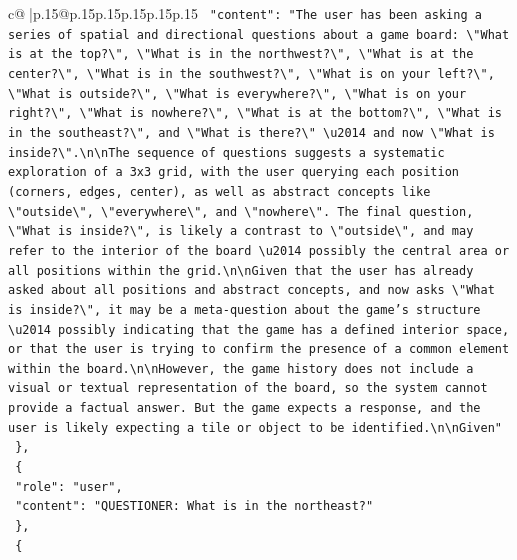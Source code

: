 \documentclass{article}
\begin{document}
{\begin{supertabular}{c@{$\;$}|p{.15\linewidth}@{}p{.15\linewidth}p{.15\linewidth}p{.15\linewidth}p{.15\linewidth}p{.15\linewidth}}
{{{\texttt{    "content": "The user has been asking a series of spatial and directional questions about a game board: \textbackslash{}"What is at the top?\textbackslash{}", \textbackslash{}"What is in the northwest?\textbackslash{}", \textbackslash{}"What is at the center?\textbackslash{}", \textbackslash{}"What is in the southwest?\textbackslash{}", \textbackslash{}"What is on your left?\textbackslash{}", \textbackslash{}"What is outside?\textbackslash{}", \textbackslash{}"What is everywhere?\textbackslash{}", \textbackslash{}"What is on your right?\textbackslash{}", \textbackslash{}"What is nowhere?\textbackslash{}", \textbackslash{}"What is at the bottom?\textbackslash{}", \textbackslash{}"What is in the southeast?\textbackslash{}", and \textbackslash{}"What is there?\textbackslash{}" \textbackslash{}u2014 and now \textbackslash{}"What is inside?\textbackslash{}".\textbackslash{}n\textbackslash{}nThe sequence of questions suggests a systematic exploration of a 3x3 grid, with the user querying each position (corners, edges, center), as well as abstract concepts like \textbackslash{}"outside\textbackslash{}", \textbackslash{}"everywhere\textbackslash{}", and \textbackslash{}"nowhere\textbackslash{}". The final question, \textbackslash{}"What is inside?\textbackslash{}", is likely a contrast to \textbackslash{}"outside\textbackslash{}", and may refer to the interior of the board \textbackslash{}u2014 possibly the central area or all positions within the grid.\textbackslash{}n\textbackslash{}nGiven that the user has already asked about all positions and abstract concepts, and now asks \textbackslash{}"What is inside?\textbackslash{}", it may be a meta{-}question about the game's structure \textbackslash{}u2014 possibly indicating that the game has a defined interior space, or that the user is trying to confirm the presence of a common element within the board.\textbackslash{}n\textbackslash{}nHowever, the game history does not include a visual or textual representation of the board, so the system cannot provide a factual answer. But the game expects a response, and the user is likely expecting a tile or object to be identified.\textbackslash{}n\textbackslash{}nGiven"} \\
\texttt{  \},} \\
\texttt{  \{} \\
\texttt{    "role": "user",} \\
\texttt{    "content": "QUESTIONER: What is in the northeast?"} \\
\texttt{  \},} \\
\texttt{  \{} \\
}}}
\end{supertabular}}
\end{document}
